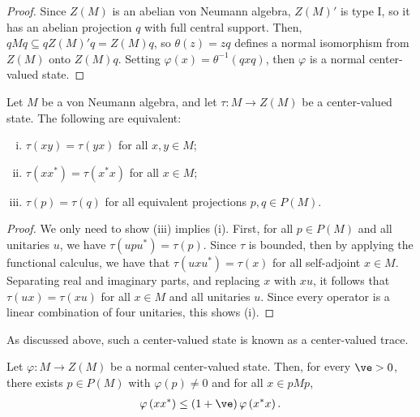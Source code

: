 \documentclass[10pt]{mypackage}
\begin{document}
\begin{proof}
  Since $Z(M)$ is an abelian von Neumann algebra, $Z(M)'$ is type I, so it has an abelian projection $q$ with full central support. Then, $qMq\subseteq qZ(M)'q = Z(M)q$, so $\theta(z) = zq$ defines a normal isomorphism from $Z(M)$ onto $Z(M)q$. Setting $\varphi(x) = \theta^{-1}\left( qxq \right)$, then $\varphi$ is a normal center-valued state.
\end{proof}
\begin{lemma}
  Let $M$ be a von Neumann algebra, and let $\tau\colon M\rightarrow Z(M)$ be a center-valued state. The following are equivalent:
  \begin{enumerate}[(i)]
    \item $\tau\left( xy \right) = \tau\left( yx \right)$ for all $x,y\in M$;
    \item $\tau\left( xx^{\ast} \right) = \tau\left( x^{\ast}x \right)$ for all $x\in M$;
    \item $\tau\left( p \right) = \tau\left( q \right)$ for all equivalent projections $p ,q\in P(M)$.
  \end{enumerate}
\end{lemma}
\begin{proof}
  We only need to show (iii) implies (i). First, for all $p\in P(M)$ and all unitaries $u$, we have $\tau\left( upu^{\ast} \right) = \tau\left( p \right)$. Since $\tau$ is bounded, then by applying the functional calculus, we have that $\tau\left( uxu^{\ast} \right) = \tau(x)$ for all self-adjoint $x\in M$. Separating real and imaginary parts, and replacing $x$ with $xu$, it follows that $\tau\left( ux \right) = \tau\left( xu \right)$ for all $x\in M$ and all unitaries $u$. Since every operator is a linear combination of four unitaries, this shows (i).
\end{proof}
As discussed above, such a center-valued state is known as a center-valued trace.
\begin{lemma}
  Let $\varphi\colon M\rightarrow Z(M)$ be a normal center-valued state. Then, for every $\ve > 0$, there exists $p\in P(M)$ with $\varphi(p)\neq 0$ and for all $x\in pMp$,
  \begin{align*}
    \varphi\left( xx^{\ast} \right)\leq \left( 1 + \ve \right) \varphi\left( x^{\ast}x \right).
  \end{align*}
\end{lemma}
\end{document}
